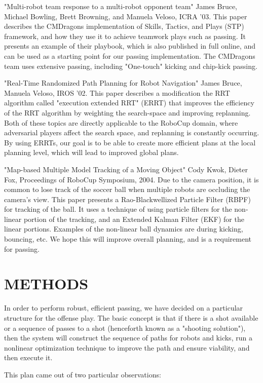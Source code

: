 \documentclass[a4paper, 10pt, conference]{ieeeconf}      %
\begin{document}
"Multi-robot team response to a multi-robot opponent team" James Bruce, Michael Bowling, Brett Browning, and Manuela Veloso, ICRA '03. This paper describes the CMDragons implementation of Skills, Tactics, and Plays (STP) framework, and how they use it to achieve teamwork plays such as passing. It presents an example of their playbook, which is also published in full online, and can be used as a starting point for our passing implementation. The CMDragons team uses extensive passing, including "One-touch" kicking and chip-kick passing.

"Real-Time Randomized Path Planning for Robot Navigation" James Bruce, Manuela Veloso, IROS '02. This paper describes a modification the RRT algorithm called "execution extended RRT" (ERRT) that improves the efficiency of the RRT algorithm by weighting the search-space and improving replanning. Both of these topics are directly applicable to the RoboCup domain, where adversarial players affect the search space, and replanning is constantly occurring. By using ERRTs, our goal is to be able to create more efficient plans at the local planning level, which will lead to improved global plans.

"Map-based Multiple Model Tracking of a Moving Object" Cody Kwok, Dieter Fox, Proceedings of RoboCup Symposium, 2004. Due to the camera position, it is common to lose track of the soccer ball when multiple robots are occluding the camera's view. This paper presents a Rao-Blackwellized Particle Filter (RBPF) for tracking of the ball. It uses a technique of using particle filters for the non-linear portion of the tracking, and an Extended Kalman Filter (EKF) for the linear portions. Examples of the non-linear ball dynamics are during kicking, bouncing, etc. We hope this will improve overall planning, and is a requirement for passing.


\section{METHODS}
In order to perform robust, efficient passing, we have decided on a particular structure for the offense play. The basic concept is that if there is a shot available or a sequence of passes to a shot (henceforth known as a "shooting solution"), then the system will construct the sequence of paths for robots and kicks, run a nonlinear optimization technique to improve the path and ensure viability, and then execute it.

This plan came out of two particular observations:
\end{document}
